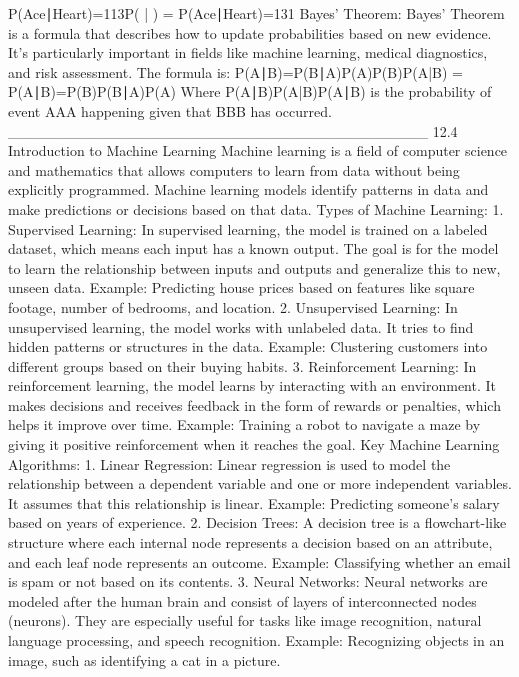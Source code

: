 P(Ace∣Heart)=113P( | ) = P(Ace∣Heart)=131
Bayes’ Theorem:
Bayes’ Theorem is a formula that describes how to update probabilities based on new evidence. It’s particularly important in fields like machine learning, medical diagnostics, and risk assessment.
The formula is:
P(A∣B)=P(B∣A)P(A)P(B)P(A|B) = P(A∣B)=P(B)P(B∣A)P(A)
Where P(A∣B)P(A|B)P(A∣B) is the probability of event AAA happening given that BBB has occurred.
________________________________________
12.4 Introduction to Machine Learning
Machine learning is a field of computer science and mathematics that allows computers to learn from data without being explicitly programmed. Machine learning models identify patterns in data and make predictions or decisions based on that data.
Types of Machine Learning:
1.	Supervised Learning: In supervised learning, the model is trained on a labeled dataset, which means each input has a known output. The goal is for the model to learn the relationship between inputs and outputs and generalize this to new, unseen data.
Example: Predicting house prices based on features like square footage, number of bedrooms, and location.
2.	Unsupervised Learning: In unsupervised learning, the model works with unlabeled data. It tries to find hidden patterns or structures in the data.
Example: Clustering customers into different groups based on their buying habits.
3.	Reinforcement Learning: In reinforcement learning, the model learns by interacting with an environment. It makes decisions and receives feedback in the form of rewards or penalties, which helps it improve over time.
Example: Training a robot to navigate a maze by giving it positive reinforcement when it reaches the goal.
Key Machine Learning Algorithms:
1.	Linear Regression: Linear regression is used to model the relationship between a dependent variable and one or more independent variables. It assumes that this relationship is linear.
Example: Predicting someone’s salary based on years of experience.
2.	Decision Trees: A decision tree is a flowchart-like structure where each internal node represents a decision based on an attribute, and each leaf node represents an outcome.
Example: Classifying whether an email is spam or not based on its contents.
3.	Neural Networks: Neural networks are modeled after the human brain and consist of layers of interconnected nodes (neurons). They are especially useful for tasks like image recognition, natural language processing, and speech recognition.
Example: Recognizing objects in an image, such as identifying a cat in a picture.
